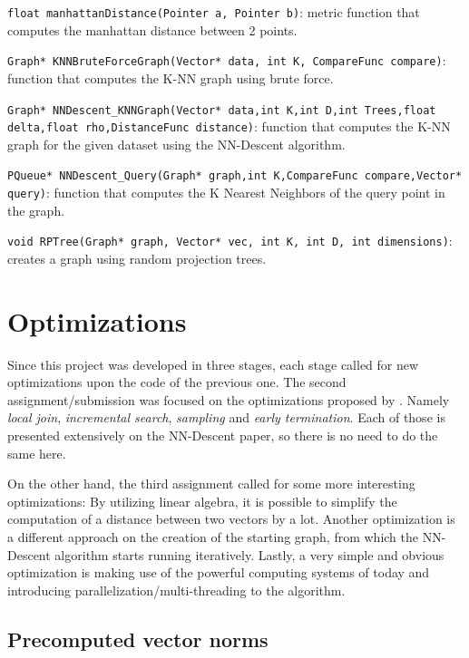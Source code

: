 \documentclass[
  10,
  letterpaperpaper,
  twocolumn]{article}
\begin{document}
\texttt{float manhattanDistance(Pointer a, Pointer b)}:
metric function that computes the manhattan distance between 2 points.

\texttt{Graph* KNNBruteForceGraph(Vector* data, int K, CompareFunc compare)}:
function that computes the K-NN graph using brute force.

\texttt{Graph* NNDescent_KNNGraph(Vector* data,int K,int D,int Trees,float delta,float rho,DistanceFunc distance)}:
function that computes the K-NN graph for the given dataset using the
NN-Descent algorithm.

\texttt{PQueue* NNDescent_Query(Graph* graph,int K,CompareFunc compare,Vector* query)}:
function that computes the K Nearest Neighbors of the query point in the
graph.

\texttt{void RPTree(Graph* graph, Vector* vec, int K, int D, int dimensions)}:
creates a graph using random projection trees.

\section{Optimizations}\label{sec:optimizations}

Since this project was developed in three stages, each stage called for
new optimizations upon the code of the previous one. The second
assignment/submission was focused on the optimizations proposed by
\textcite{dongEfficientKnearestNeighbor2011}. Namely \emph{local join},
\emph{incremental search}, \emph{sampling} and \emph{early termination}.
Each of those is presented extensively on the NN-Descent paper, so there
is no need to do the same here.

On the other hand, the third assignment called for some more interesting
optimizations: By utilizing linear algebra, it is possible to simplify
the computation of a distance between two vectors by a lot. Another
optimization is a different approach on the creation of the starting
graph, from which the NN-Descent algorithm starts running iteratively.
Lastly, a very simple and obvious optimization is making use of the
powerful computing systems of today and introducing
parallelization/multi-threading to the algorithm.

\subsection{Precomputed vector norms}\label{precomputed-vector-norms}
\end{document}
